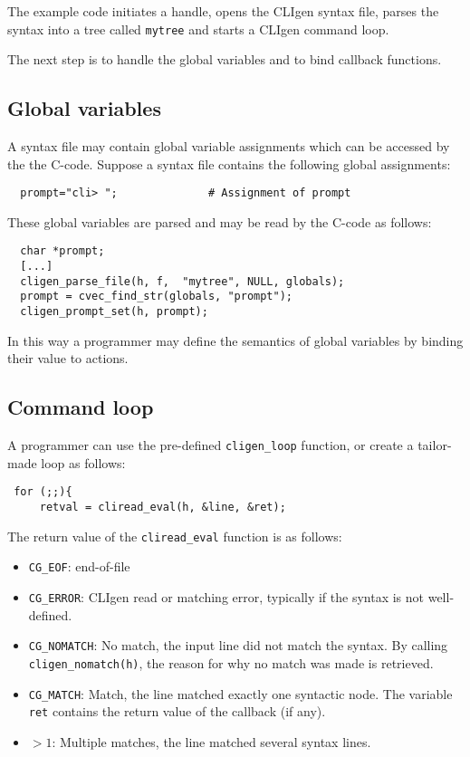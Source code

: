 \documentclass[a4paper, 10pt] {article}
\begin{document}
The example code initiates a handle, opens the CLIgen syntax file, parses the
syntax into a tree called {\tt mytree} and starts a CLIgen command loop.

The next step is to handle the global variables and to bind callback
functions.

\subsection{Global variables}
\label{sec:global}

A syntax file may contain global variable assignments which can be
accessed by the the C-code. Suppose a syntax file contains the following global assignments:
\begin{verbatim}
  prompt="cli> ";              # Assignment of prompt
\end{verbatim}

These global variables are parsed and may be read by the C-code as follows:
\begin{verbatim}
  char *prompt;
  [...]
  cligen_parse_file(h, f,  "mytree", NULL, globals);
  prompt = cvec_find_str(globals, "prompt");
  cligen_prompt_set(h, prompt);
\end{verbatim}

In this way a programmer may define the semantics of global variables
by binding their value to actions.

\subsection{Command loop}
\label{sec:main}

A programmer can use the pre-defined {\tt cligen\_loop} function, or create a tailor-made loop as follows:

\begin{verbatim}
 for (;;){
     retval = cliread_eval(h, &line, &ret);
\end{verbatim}
The return value of the {\tt cliread\_eval} function is as follows:
\begin{itemize}
\item {\tt CG\_EOF}: end-of-file
\item {\tt CG\_ERROR}: CLIgen read or matching error, typically if the syntax is not well-defined.
\item {\tt CG\_NOMATCH}: No match, the input line did not match the syntax. By calling {\tt cligen\_nomatch(h)}, the reason for why no match was made is retrieved.
\item {\tt CG\_MATCH}: Match, the line matched exactly one syntactic node. The variable {\tt ret} contains the return value of the callback (if any).
\item $> 1$: Multiple matches, the line matched several syntax lines.
\end{itemize}
\end{document}
